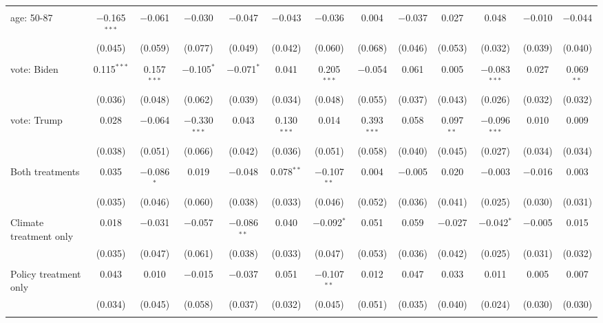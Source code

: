 \begin{tabular}{@{\extracolsep{5pt}}lcccccccccccc}
  & & & & & & & & & & & & \\ 
 age: 50-87 & $-$0.165$^{***}$ & $-$0.061 & $-$0.030 & $-$0.047 & $-$0.043 & $-$0.036 & 0.004 & $-$0.037 & 0.027 & 0.048 & $-$0.010 & $-$0.044 \\ 
  & (0.045) & (0.059) & (0.077) & (0.049) & (0.042) & (0.060) & (0.068) & (0.046) & (0.053) & (0.032) & (0.039) & (0.040) \\ 
  & & & & & & & & & & & & \\ 
 vote: Biden & 0.115$^{***}$ & 0.157$^{***}$ & $-$0.105$^{*}$ & $-$0.071$^{*}$ & 0.041 & 0.205$^{***}$ & $-$0.054 & 0.061 & 0.005 & $-$0.083$^{***}$ & 0.027 & 0.069$^{**}$ \\ 
  & (0.036) & (0.048) & (0.062) & (0.039) & (0.034) & (0.048) & (0.055) & (0.037) & (0.043) & (0.026) & (0.032) & (0.032) \\ 
  & & & & & & & & & & & & \\ 
 vote: Trump & 0.028 & $-$0.064 & $-$0.330$^{***}$ & 0.043 & 0.130$^{***}$ & 0.014 & 0.393$^{***}$ & 0.058 & 0.097$^{**}$ & $-$0.096$^{***}$ & 0.010 & 0.009 \\ 
  & (0.038) & (0.051) & (0.066) & (0.042) & (0.036) & (0.051) & (0.058) & (0.040) & (0.045) & (0.027) & (0.034) & (0.034) \\ 
  & & & & & & & & & & & & \\ 
 Both treatments & 0.035 & $-$0.086$^{*}$ & 0.019 & $-$0.048 & 0.078$^{**}$ & $-$0.107$^{**}$ & 0.004 & $-$0.005 & 0.020 & $-$0.003 & $-$0.016 & 0.003 \\ 
  & (0.035) & (0.046) & (0.060) & (0.038) & (0.033) & (0.046) & (0.052) & (0.036) & (0.041) & (0.025) & (0.030) & (0.031) \\ 
  & & & & & & & & & & & & \\ 
 Climate treatment only & 0.018 & $-$0.031 & $-$0.057 & $-$0.086$^{**}$ & 0.040 & $-$0.092$^{*}$ & 0.051 & 0.059 & $-$0.027 & $-$0.042$^{*}$ & $-$0.005 & 0.015 \\ 
  & (0.035) & (0.047) & (0.061) & (0.038) & (0.033) & (0.047) & (0.053) & (0.036) & (0.042) & (0.025) & (0.031) & (0.032) \\ 
  & & & & & & & & & & & & \\ 
 Policy treatment only & 0.043 & 0.010 & $-$0.015 & $-$0.037 & 0.051 & $-$0.107$^{**}$ & 0.012 & 0.047 & 0.033 & 0.011 & 0.005 & 0.007 \\ 
  & (0.034) & (0.045) & (0.058) & (0.037) & (0.032) & (0.045) & (0.051) & (0.035) & (0.040) & (0.024) & (0.030) & (0.030) \\ 
  & & & & & & & & & & & & \\ 

\end{tabular}
